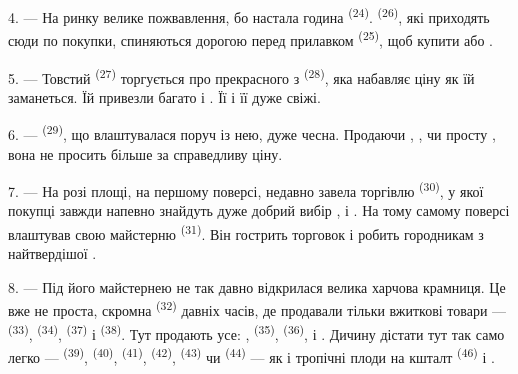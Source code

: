 4. --- На ринку велике пожвавлення, бо настала година 
\textsuperscript{(24)}.  \textsuperscript{(26)}, які приходять
сюди по покупки, спиняються дорогою перед прилавком  \textsuperscript{(25)}, щоб купити  або .

5. --- Товстий  \textsuperscript{(27)} торгується про прекрасного
 з  \textsuperscript{(28)}, яка набавляє ціну як
їй заманеться. Їй привезли багато  і
. Її  і її  дуже свіжі.

\VUsaut{4.0mm}
\VUsaut{3.0mm}

6. ---  \textsuperscript{(29)}, що влаштувалася поруч із
нею, дуже чесна. Продаючи , ,  чи
просту , вона не просить більше за справедливу ціну.

7. --- На розі площі, на першому поверсі, недавно завела торгівлю
 \textsuperscript{(30)}, у якої покупці завжди напевно
знайдуть дуже добрий вибір ,  і
. На тому самому поверсі влаштував свою майстерню
 \textsuperscript{(31)}. Він гострить  торговок і
робить городникам  з найтвердішої .

\VUsaut{4.0mm}
\VUsaut{3.0mm}

8. --- Під його майстернею не так давно відкрилася велика харчова крамниця. Це
вже не проста, скромна  \textsuperscript{(32)}
давніх часів, де продавали тільки вжиткові товари --- 
\textsuperscript{(33)},  \textsuperscript{(34)},  \textsuperscript{(37)} і  \textsuperscript{(38)}. Тут
продають усе: , 
\textsuperscript{(35)},  \textsuperscript{(36)},  і . Дичину дістати тут так само легко ---
 \textsuperscript{(39)},  \textsuperscript{(40)},
 \textsuperscript{(41)}, 
\textsuperscript{(42)},  \textsuperscript{(43)} чи
 \textsuperscript{(44)} --- як і тропічні плоди на кшталт
 \textsuperscript{(46)} і .

